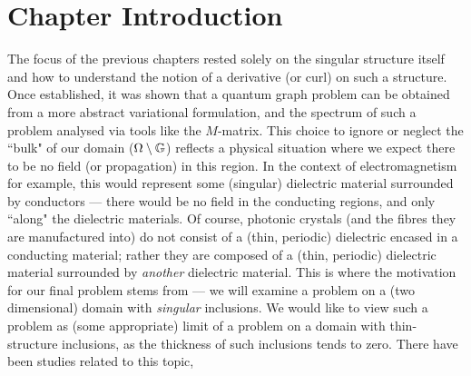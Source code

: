 \section{Chapter Introduction} \label{sec:SingIncChapterIntro}

The focus of the previous chapters  rested solely on the singular structure itself and how to understand the notion of a derivative (or curl) on such a structure.
Once established, it was shown that a quantum graph problem can be obtained from a more abstract variational formulation, and the spectrum of such a problem analysed via tools like the $M$-matrix.
This choice to ignore or neglect the ``bulk" of our domain ($\Omega\setminus\mathbb{G}$) reflects a physical situation where we expect there to be no field (or propagation) in this region.
In the context of electromagnetism for example, this would represent some (singular) dielectric material surrounded by conductors --- there would be no field in the conducting regions, and only ``along" the dielectric materials.
Of course, photonic crystals (and the fibres they are manufactured into) do not consist of a (thin, periodic) dielectric encased in a conducting material; rather they are composed of a (thin, periodic) dielectric material surrounded by \emph{another} dielectric material.
This is where the motivation for our final problem stems from --- we will examine a problem on a (two dimensional) domain with \emph{singular} inclusions.
We would like to view such a problem as (some appropriate) limit of a problem on a domain with thin-structure inclusions, as the thickness of such inclusions tends to zero.
There have been studies related to this topic, 

